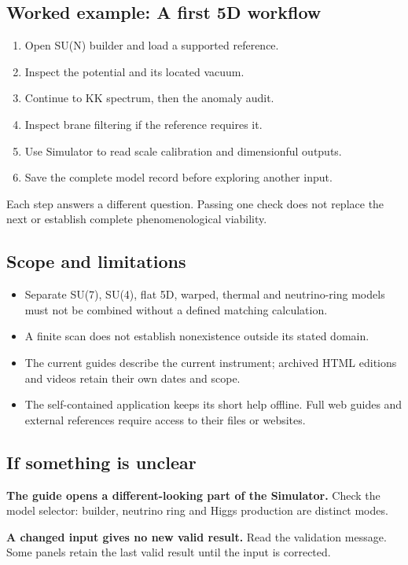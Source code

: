 \documentclass[11pt,a4paper]{article}
\begin{document}
\subsection*{Worked example: A first 5D workflow}
\begin{enumerate}
\item Open SU(N) builder and load a supported reference.
\item Inspect the potential and its located vacuum.
\item Continue to KK spectrum, then the anomaly audit.
\item Inspect brane filtering if the reference requires it.
\item Use Simulator to read scale calibration and dimensionful outputs.
\item Save the complete model record before exploring another input.
\end{enumerate}
Each step answers a different question. Passing one check does not replace the next or establish complete phenomenological viability.
\subsection*{Scope and limitations}
\begin{itemize}
\item Separate SU(7), SU(4), flat 5D, warped, thermal and neutrino-ring models must not be combined without a defined matching calculation.
\item A finite scan does not establish nonexistence outside its stated domain.
\item The current guides describe the current instrument; archived HTML editions and videos retain their own dates and scope.
\item The self-contained application keeps its short help offline. Full web guides and external references require access to their files or websites.
\end{itemize}
\subsection*{If something is unclear}
\textbf{The guide opens a different-looking part of the Simulator.} Check the model selector: builder, neutrino ring and Higgs production are distinct modes.

\textbf{A changed input gives no new valid result.} Read the validation message. Some panels retain the last valid result until the input is corrected.
\end{document}
